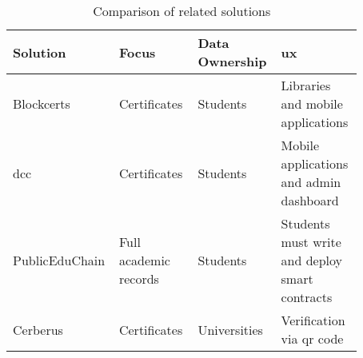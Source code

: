 \begin{table}
\centering
\caption{Comparison of related solutions}
\label{tab:relSolutions}
\begin{tabular}{|p{0.20\linewidth}|p{0.22\linewidth}|p{0.22\linewidth}|p{0.23\linewidth}|}
\hline
\textbf{Solution} & \textbf{Focus} & \textbf{Data Ownership} & \textbf{\gls{ux}} \\
\hline
Blockcerts & Certificates & Students & Libraries and mobile applications \\
\hline
\acrshort{dcc} & Certificates & Students & Mobile applications and admin dashboard \\
\hline
PublicEduChain & Full academic records & Students & Students must write and deploy smart contracts \\
\hline
Cerberus & Certificates & Universities & Verification via \gls{qr} code \\
\hline
\end{tabular}
\end{table}
